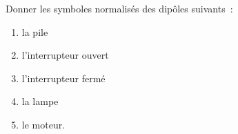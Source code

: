 Donner les symboles normalisés des dipôles suivants~:
\begin{enumerate}[label=\textbf{\alph*)}]
    \item la pile
    \item l'interrupteur ouvert
    \item l'interrupteur fermé
    \item la lampe
    \item le moteur.
\end{enumerate}


